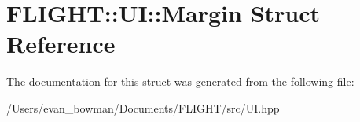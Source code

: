\hypertarget{struct_f_l_i_g_h_t_1_1_u_i_1_1_margin}{}\section{F\+L\+I\+G\+HT\+:\+:UI\+:\+:Margin Struct Reference}
\label{struct_f_l_i_g_h_t_1_1_u_i_1_1_margin}


The documentation for this struct was generated from the following file\+:\begin{DoxyCompactItemize}
\item 
/\+Users/evan\+\_\+bowman/\+Documents/\+F\+L\+I\+G\+H\+T/src/U\+I.\+hpp\end{DoxyCompactItemize}
